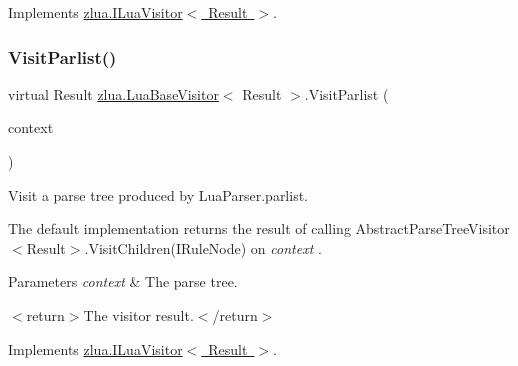 Implements \mbox{\hyperlink{interfacezlua_1_1_i_lua_visitor_aef0728911afc4d23d64f1b6f0cd575b3}{zlua.\+I\+Lua\+Visitor$<$ Result $>$}}.

\mbox{\label{classzlua_1_1_lua_base_visitor_a2dc2a658f068fc6064d256d3c19b1b0d}} 
\subsubsection{\texorpdfstring{Visit\+Parlist()}{VisitParlist()}}
{\footnotesize\ttfamily virtual Result \mbox{\hyperlink{classzlua_1_1_lua_base_visitor}{zlua.\+Lua\+Base\+Visitor}}$<$ Result $>$.Visit\+Parlist (\begin{DoxyParamCaption}\item[{\mbox{[}\+Not\+Null\mbox{]} \mbox{\hyperlink{classzlua_1_1_lua_parser_1_1_parlist_context}{Lua\+Parser.\+Parlist\+Context}}}]{context }\end{DoxyParamCaption})\hspace{0.3cm}{\ttfamily [virtual]}}



Visit a parse tree produced by Lua\+Parser.\+parlist. 

The default implementation returns the result of calling Abstract\+Parse\+Tree\+Visitor$<$\+Result$>$.\+Visit\+Children(\+I\+Rule\+Node) on {\itshape context} . 


\begin{DoxyParams}{Parameters}
{\em context} & The parse tree.\\
\hline
\end{DoxyParams}
$<$return$>$The visitor result.$<$/return$>$ 

Implements \mbox{\hyperlink{interfacezlua_1_1_i_lua_visitor_a8971a5b8bc82eb9d9ddfc1509538c293}{zlua.\+I\+Lua\+Visitor$<$ Result $>$}}.

\mbox{\label{classzlua_1_1_lua_base_visitor_a77ce0adce8dcce58ae649a008ff905bc}} 

